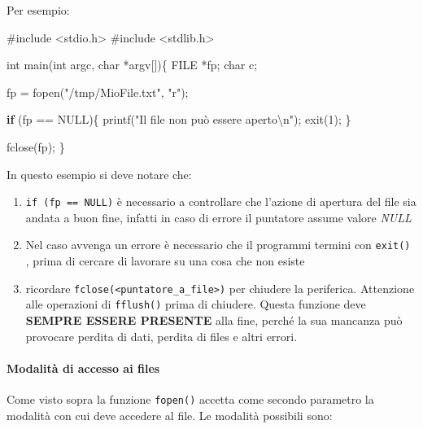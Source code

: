 \documentclass[
]{article}
\newenvironment{Shaded}{}{}
\newcommand{\ControlFlowTok}[1]{\textcolor[rgb]{0.00,0.44,0.13}{\textbf{#1}}}
\newcommand{\DataTypeTok}[1]{\textcolor[rgb]{0.56,0.13,0.00}{#1}}
\newcommand{\DecValTok}[1]{\textcolor[rgb]{0.25,0.63,0.44}{#1}}
\newcommand{\ImportTok}[1]{#1}
\newcommand{\NormalTok}[1]{#1}
\newcommand{\PreprocessorTok}[1]{\textcolor[rgb]{0.74,0.48,0.00}{#1}}
\newcommand{\SpecialCharTok}[1]{\textcolor[rgb]{0.25,0.44,0.63}{#1}}
\newcommand{\StringTok}[1]{\textcolor[rgb]{0.25,0.44,0.63}{#1}}
\begin{document}
Per esempio:

\begin{Shaded}
\begin{Highlighting}[]
\PreprocessorTok{\#include }\ImportTok{\textless{}stdio.h\textgreater{}}
\PreprocessorTok{\#include }\ImportTok{\textless{}stdlib.h\textgreater{}}

\DataTypeTok{int}\NormalTok{ main(}\DataTypeTok{int}\NormalTok{ argc, }\DataTypeTok{char}\NormalTok{ *argv[])\{}
    \DataTypeTok{FILE}\NormalTok{ *fp;}
    \DataTypeTok{char}\NormalTok{ c;}
    
\NormalTok{    fp = fopen(}\StringTok{"/tmp/MioFile.txt"}\NormalTok{, }\StringTok{"r"}\NormalTok{);}
    
    \ControlFlowTok{if}\NormalTok{ (fp == NULL)\{}
\NormalTok{        printf(}\StringTok{"Il file non può essere aperto}\SpecialCharTok{\textbackslash{}n}\StringTok{"}\NormalTok{);}
\NormalTok{        exit(}\DecValTok{1}\NormalTok{);}
\NormalTok{    \}}
    
\NormalTok{    fclose(fp);}
\NormalTok{\}}
\end{Highlighting}
\end{Shaded}

In questo esempio si deve notare che:

\begin{enumerate}
\def\labelenumi{\arabic{enumi}.}
\item
  \texttt{if\ (fp\ ==\ NULL)} è necessario a controllare che l'azione di
  apertura del file sia andata a buon fine, infatti in caso di errore il
  puntatore assume valore \emph{NULL}
\item
  Nel caso avvenga un errore è necessario che il programmi termini con
  \texttt{exit()} , prima di cercare di lavorare su una cosa che non
  esiste
\item
  ricordare \texttt{fclose(\textless{}puntatore\_a\_file\textgreater{})}
  per chiudere la periferica. Attenzione alle operazioni di
  \texttt{fflush()} prima di chiudere. Questa funzione deve
  \textbf{SEMPRE ESSERE PRESENTE} alla fine, perché la sua mancanza può
  provocare perdita di dati, perdita di files e altri errori.
\end{enumerate}

\hypertarget{header-n984}{%
\paragraph{Modalità di accesso ai files}\label{header-n984}}

Come visto sopra la funzione \texttt{fopen()} accetta come secondo
parametro la modalità con cui deve accedere al file. Le modalità
possibili sono:
\end{document}
